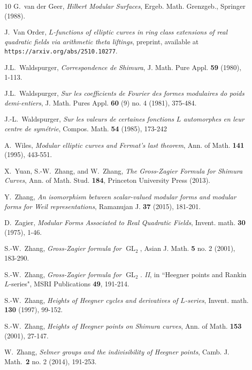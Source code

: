 \documentclass{amsart}
\theoremstyle{definition}
\theoremstyle{definition}
\theoremstyle{definition}
\begin{document}
\begin{thebibliography}{10}
 G.~van der Geer, {\it{Hilbert Modular Surfaces}}, Ergeb. Math. Grenzgeb., Springer (1988).

 J.~Van Order, {\it{$L$-functions of elliptic curves in ring class extensions of real quadratic fields via arithmetic theta liftings}}, preprint, 
available at \texttt{https://arxiv.org/abs/2510.10277}. 

 J.L.~Waldspurger, {\it{Correspondence de Shimura}}, J. Math. Pure Appl. {\bf{59}} (1980), 1-113.

 J.L.~Waldspurger, {\it{Sur les coefficients de Fourier des formes modulaires do poids demi-entiers}}, J. Math. Pures Appl. {\bf{60}} (9) no. 4 (1981), 375-484.

 J.-L.~Waldspurger, {\it{Sur les valeurs de certaines fonctions $L$ automorphes en leur centre de sym\'etrie}}, Compos. Math. {\bf{54}} (1985), 173-242

 A.~Wiles, {\it{Modular elliptic curves and Fermat's last theorem}}, Ann. of Math. {\bf{141}} (1995), 443-551.

 X.~Yuan, S.-W.~Zhang, and W.~Zhang, {\it{The Gross-Zagier Formula for Shimura Curves}}, 
Ann. of Math. Stud. {\bf{184}}, Princeton University Press (2013).

 Y.~Zhang, {\it{An isomorphism between scalar-valued modular forms and modular forms for Weil representations}}, Ramanujan J. {\bf{37}} (2015), 181-201.

 D.~Zagier, {\it{Modular Forms Associated to Real Quadratic Fields}}, Invent. math. {\bf{30}} (1975), 1-46.

 S.-W.~Zhang, {\it{Gross-Zagier formula for $\operatorname{GL}_2$}}, Asian J. Math. {\bf{5}} no. 2 (2001), 183-290.

 S.-W.~Zhang, {\it{Gross-Zagier formula for $\operatorname{GL}_2$. II}}, in ``Heegner points and Rankin $L$-series",
MSRI Publications {\bf{49}}, 191-214.

 S.-W.~Zhang, {\it{Heights of Heegner cycles and derivatives of $L$-series}}, Invent. math. {\bf{130}} (1997), 99-152.

 S.-W.~Zhang, {\it{Heights of Heegner points on Shimura curves}}, Ann. of Math. {\bf{153}} (2001), 27-147.

 W.~Zhang, {\it{Selmer groups and the indivisibility of Heegner points}}, Camb. J. Math.~{\bf{2}} no. 2 (2014), 191-253.

\end{thebibliography}
\end{document}

